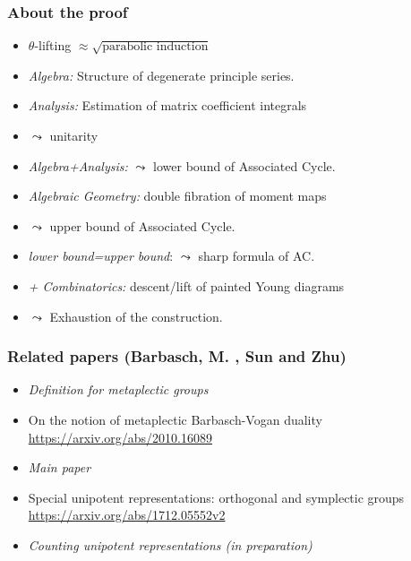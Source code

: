 \documentclass[t,11pt,handout,usenames,dvipsnames]{beamer}
\theoremstyle{plain}
\theoremstyle{definition}
\def\blue{\color{blue}}
\let\oldemph\emph
\def\emph#1{\oldemph{\blue #1}}
\begin{document}
    \begin{frame}
      \frametitle{About the proof}
      \begin{itemize}[<+->]
        \item $\theta$-lifting $\approx \sqrt{\text{parabolic induction}}$
        \item \emph{Algebra: } Structure of degenerate principle series.
        \item \emph{Analysis:} Estimation of matrix coefficient integrals
        \item[] $\leadsto$ unitarity
        \item \emph{Algebra+Analysis: } $\leadsto$ lower bound of Associated Cycle.
        \item \emph{Algebraic Geometry:} double fibration of moment maps
        \item[] $\leadsto$ upper bound of Associated Cycle.
        \item \emph{lower bound=upper bound}: $\leadsto$ sharp formula of AC.
        \item \emph{+ Combinatorics: } descent/lift of painted Young diagrams
        \item[] $\leadsto$ Exhaustion of the construction.
      \end{itemize}
    \end{frame}

    \begin{frame}
      \frametitle{Related papers (Barbasch, M. ,  Sun and  Zhu)}
        \vfill
        \begin{itemize}
          \item \emph{Definition for metaplectic groups}
          \item[]
   	On the notion of metaplectic Barbasch-Vogan duality
        \href{https://arxiv.org/abs/2010.16089}{https://arxiv.org/abs/2010.16089}
          \item \emph{Main paper}
          \item[]
        Special unipotent representations: orthogonal and symplectic groups\\
        \href{https://arxiv.org/abs/1712.05552v2}{https://arxiv.org/abs/1712.05552v2}
          \item \emph{Counting unipotent representations (in preparation)}
        \vfill
         \end{itemize}
    \end{frame}
\end{document}
